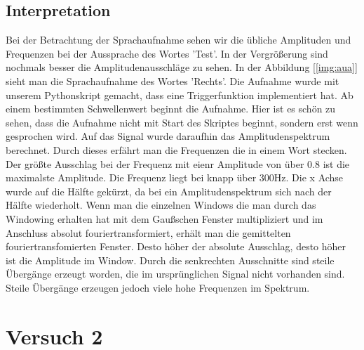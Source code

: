 \documentclass[12pt, oneside, a4paper, \docLanguage]{report}
\begin{document}
\section{Interpretation}
\label{chap:VERSUCH_1_INTERPRETATION}
Bei der Betrachtung der Sprachaufnahme sehen wir die übliche Amplituden und Frequenzen bei der Aussprache des Wortes 'Test'.
In der Vergrößerung sind nochmals besser die Amplitudenausschläge zu sehen.
\newline 
\newline
In der Abbildung [\ref{img:aua}] sieht man die Sprachaufnahme des Wortes 'Rechts'.
Die Aufnahme wurde mit unserem Pythonskript gemacht, dass eine Triggerfunktion implementiert hat.
\newline
Ab einem bestimmten Schwellenwert beginnt die Aufnahme. 
\newline
Hier ist es schön zu sehen, dass die Aufnahme nicht mit Start des Skriptes beginnt, sondern erst wenn gesprochen wird. 
\newline 
\newline
Auf das Signal wurde daraufhin das Amplitudenspektrum berechnet. Durch dieses erfährt man die Frequenzen die in einem Wort stecken.
Der größte Ausschlag bei der Frequenz mit eienr Amplitude von über 0.8 ist die maximalste Amplitude. 
\newline
Die Frequenz liegt bei knapp über 300Hz.
Die x Achse wurde  auf die Hälfte gekürzt, da bei ein Amplitudenspektrum sich nach der Hälfte wiederholt.
\newline
\newline
Wenn man die einzelnen Windows die man durch das Windowing erhalten hat mit dem Gaußschen Fenster multipliziert und im Anschluss absolut fouriertransformiert, erhält man die gemittelten fouriertransfomierten Fenster.
\newline
Desto höher der absolute Ausschlag, desto höher ist die Amplitude im Window. Durch die senkrechten Ausschnitte sind steile Übergänge erzeugt
worden, die im ursprünglichen Signal nicht vorhanden sind. 
\newline
Steile Übergänge erzeugen jedoch viele hohe Frequenzen im Spektrum.
%
%
\chapter{Versuch 2}
\label{chap:VERSUCH_2}
\end{document}
